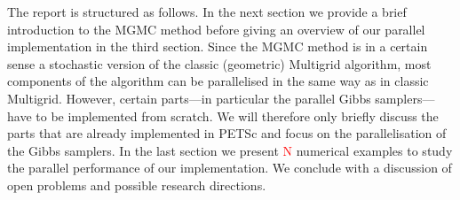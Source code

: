 \documentclass[
fontsize=11pt,
paper=a4,
numbers=noenddot
]{scrartcl}
\begin{document}

The report is structured as follows. In the next section we provide a brief introduction to the MGMC method before giving an overview of our parallel implementation in the third section. Since the MGMC method is in a certain sense a stochastic version of the classic (geometric) Multigrid algorithm, most components of the algorithm can be parallelised in the same way as in classic Multigrid.
However, certain parts---in particular the parallel Gibbs samplers---have to be implemented from scratch. We will therefore only briefly discuss the parts that are already implemented in PETSc and focus on the  parallelisation of the Gibbs samplers. In the last section we present \textcolor{red}{N} numerical examples to study the parallel performance of our implementation. We conclude with a discussion of open problems and possible research directions.
\end{document}
